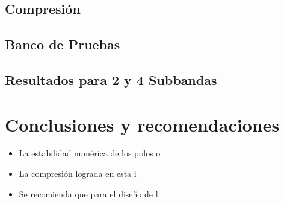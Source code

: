 \documentclass[conference]{IEEEtran}
\begin{document}
\subsection{Compresión}


\subsection{Banco de Pruebas}

\subsection{Resultados para 2 y 4 Subbandas}

\section{\textbf{Conclusiones y recomendaciones}}\label{secConclu}

\begin{itemize}
\item La estabilidad numérica de los polos o
\item La compresión lograda en esta i
\item Se recomienda que para el diseño de l
\end{itemize}

\renewcommand{\refname}{\textbf{Referencias}}

{}

\clearpage
\onecolumn
\end{document}
